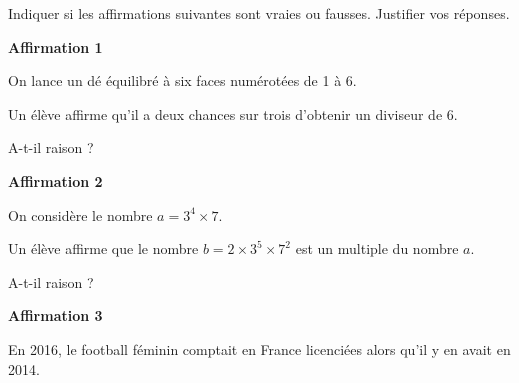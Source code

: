 \documentclass[10pt]{article}
\begin{document}
\setlength\parindent{0mm}
\pagestyle{fancy}
\thispagestyle{empty}
    
    
    




\medskip

Indiquer si les affirmations suivantes sont vraies ou fausses. Justifier vos réponses.

\medskip

\textbf{Affirmation 1}

\smallskip

On lance un dé équilibré à six faces numérotées de 1 à 6.

Un élève affirme qu'il a deux chances sur trois d'obtenir un diviseur de 6.

A-t-il raison ?

\medskip

\textbf{Affirmation 2}

\smallskip

On considère le nombre $a = 3^4 \times 7$.

Un élève affirme que le nombre $b = 2 \times 3^5 \times 7^2$ est un multiple du nombre $a$.

A-t-il raison ?

\medskip

\textbf{Affirmation 3}

\smallskip

En 2016, le football féminin comptait en France  licenciées alors qu'il y en avait  en 2014.
\end{document}
